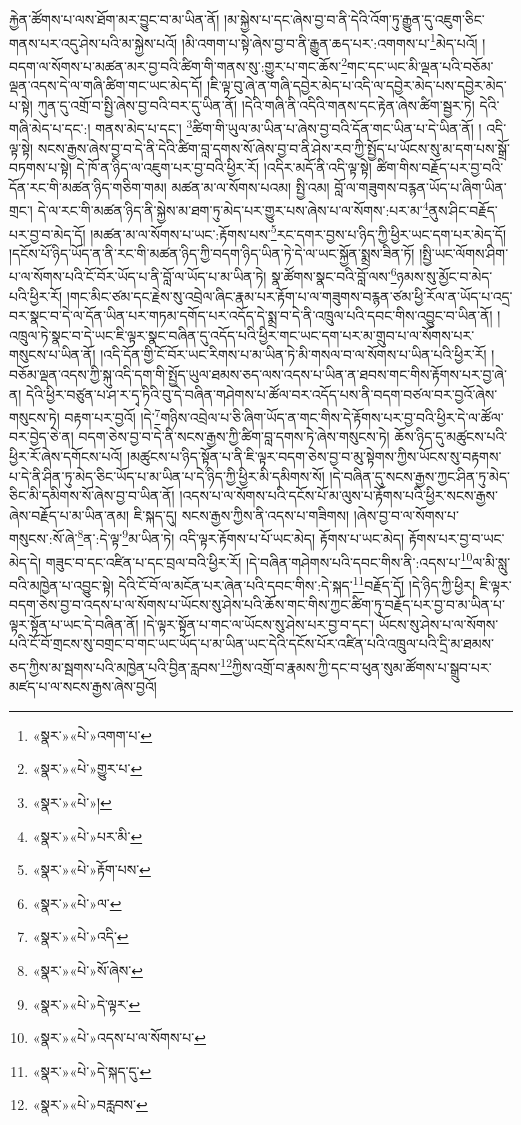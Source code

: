 རྐྱེན་ཚོགས་པ་ལས་ཐོག་མར་བྱུང་བ་མ་ཡིན་ནོ། །མ་སྐྱེས་པ་དང་ཞེས་བྱ་བ་ནི་དེའི་འོག་ཏུ་རྒྱུན་དུ་འཇུག་ཅིང་གནས་པར་འདུ་ཤེས་པའི་མ་སྐྱེས་པའོ། །མི་འགག་པ་སྟེ་ཞེས་བྱ་བ་ནི་རྒྱུན་ཆད་པར་:འགགས་པ་\footnote{«སྣར་»«པེ་»འགག་པ་}མེད་པའོ། །བདག་ལ་སོགས་པ་མཚན་མར་བྱ་བའི་ཚིག་གི་གནས་སུ་:གྱུར་པ་གང་ཆོས་\footnote{«སྣར་»«པེ་»གྱུར་པ་}གང་དང་ཡང་མི་ལྡན་པའི་བཅོམ་ལྡན་འདས་དེ་ལ་གཞི་ཚིག་གང་ཡང་མེད་དོ། །ཇི་ལྟ་བུ་ཞེ་ན་གཞི་དབྱེར་མེད་པ་འདི་ལ་དབྱེར་མེད་པས་དབྱེར་མེད་པ་སྟེ། ཀུན་དུ་འགྲོ་བ་སྤྱི་ཞེས་བྱ་བའི་བར་དུ་ཡིན་ནོ། །དེའི་གཞི་ནི་འདིའི་གནས་དང་རྟེན་ཞེས་ཚིག་སྦྱར་ཏེ། དེའི་གཞི་མེད་པ་དང་:། གནས་མེད་པ་དང་། \footnote{«སྣར་»«པེ་»།  }ཚིག་གི་ཡུལ་མ་ཡིན་པ་ཞེས་བྱ་བའི་དོན་གང་ཡིན་པ་དེ་ཡིན་ནོ། །
འདི་ལྟ་སྟེ། སངས་རྒྱས་ཞེས་བྱ་བ་དེ་ནི་དེའི་ཚིག་བླ་དགས་སོ་ཞེས་བྱ་བ་ནི་ཤེས་རབ་ཀྱི་སྤྱོད་པ་ཡོངས་སུ་མ་དག་པས་སྒྲོ་བཏགས་པ་སྟེ། དེ་ཁོ་ན་ཉིད་ལ་འཇུག་པར་བྱ་བའི་ཕྱིར་རོ། །འདིར་མདོ་ནི་འདི་ལྟ་སྟེ། ཚིག་གིས་བརྗོད་པར་བྱ་བའི་དོན་རང་གི་མཚན་ཉིད་གཅིག་གམ། མཚན་མ་ལ་སོགས་པའམ། སྤྱི་འམ། བློ་ལ་གཟུགས་བརྙན་ཡོད་པ་ཞིག་ཡིན་གྲང་། དེ་ལ་རང་གི་མཚན་ཉིད་ནི་སྐྱེས་མ་ཐག་ཏུ་མེད་པར་གྱུར་པས་ཞེས་པ་ལ་སོགས་:པར་མ་\footnote{«སྣར་»«པེ་»པར་མི་}ནུས་ཤིང་བརྗོད་པར་བྱ་བ་མེད་དོ། །མཚན་མ་ལ་སོགས་པ་ཡང་:རྟོགས་པས་\footnote{«སྣར་»«པེ་»རྟོག་པས་}རང་དགར་བྱས་པ་ཉིད་ཀྱི་ཕྱིར་ཡང་དག་པར་མེད་དོ། །དངོས་པོ་ཉིད་ཡོད་ན་ནི་རང་གི་མཚན་ཉིད་ཀྱི་བདག་ཉིད་ཡིན་ཏེ་དེ་ལ་ཡང་སྐྱོན་སྨྲས་ཟིན་ཏོ། །སྤྱི་ཡང་ལོགས་ཤིག་པ་ལ་སོགས་པའི་ངོ་བོར་ཡོད་པ་ནི་བློ་ལ་ཡོད་པ་མ་ཡིན་ཏེ། སྣ་ཚོགས་སྣང་བའི་བློ་ལས་\footnote{«སྣར་»«པེ་»ལ་}ཉམས་སུ་མྱོང་བ་མེད་པའི་ཕྱིར་རོ། །གང་མིང་ཙམ་དང་རྗེས་སུ་འབྲེལ་ཞིང་རྣམ་པར་རྟོག་པ་ལ་གཟུགས་བརྙན་ཙམ་ཕྱི་རོལ་ན་ཡོད་པ་འདྲ་བར་སྣང་བ་དེ་ལ་དོན་ཡིན་པར་གཏམ་དགོད་པར་འདོད་དེ་སྨྲ་བ་དེ་ནི་འཁྲུལ་པའི་དབང་གིས་འབྱུང་བ་ཡིན་ནོ། །འཁྲུལ་ཏེ་སྣང་བ་དེ་ཡང་ཇི་ལྟར་སྣང་བཞིན་དུ་འདོད་པའི་ཕྱིར་གང་ཡང་དག་པར་མ་གྲུབ་པ་ལ་སོགས་པར་གསུངས་པ་ཡིན་ནོ། །འདི་དོན་གྱི་ངོ་བོར་ཡང་རིགས་པ་མ་ཡིན་ཏེ་མི་གསལ་བ་ལ་སོགས་པ་ཡིན་པའི་ཕྱིར་རོ། །བཅོམ་ལྡན་འདས་ཀྱི་སྐུ་འདི་དག་གི་སྤྱོད་ཡུལ་ཐམས་ཅད་ལས་འདས་པ་ཡིན་ན་ཐབས་གང་གིས་རྟོགས་པར་བྱ་ཞེ་ན། དེའི་ཕྱིར་བཙུན་པ་ཤ་ར་དྭ་ཏིའི་བུ་དེ་བཞིན་གཤེགས་པ་ཚོལ་བར་འདོད་པས་ནི་བདག་བཙལ་བར་བྱའོ་ཞེས་གསུངས་ཏེ། བརྟག་པར་བྱའོ། །དེ་\footnote{«སྣར་»«པེ་»འདི་}གཉིས་འབྲེལ་པ་ཅི་ཞིག་ཡོད་ན་གང་གིས་དེ་རྟོགས་པར་བྱ་བའི་ཕྱིར་དེ་ལ་ཚོལ་བར་བྱེད་ཅེ་ན། བདག་ཅེས་བྱ་བ་དེ་ནི་སངས་རྒྱས་ཀྱི་ཚིག་བླ་དགས་ཏེ་ཞེས་གསུངས་ཏེ། ཆོས་ཉིད་དུ་མཚུངས་པའི་ཕྱིར་རོ་ཞེས་དགོངས་པའོ། །མཚུངས་པ་ཉིད་སྟོན་པ་ནི་ཇི་ལྟར་བདག་ཅེས་བྱ་བ་མུ་སྟེགས་ཀྱིས་ཡོངས་སུ་བརྟགས་པ་དེ་ནི་ཤིན་ཏུ་མེད་ཅིང་ཡོད་པ་མ་ཡིན་པ་དེ་ཉིད་ཀྱི་ཕྱིར་མི་དམིགས་སོ། །དེ་བཞིན་དུ་སངས་རྒྱས་ཀྱང་ཤིན་ཏུ་མེད་ཅིང་མི་དམིགས་སོ་ཞེས་བྱ་བ་ཡིན་ནོ། །འདས་པ་ལ་སོགས་པའི་དངོས་པོ་མ་ལུས་པ་རྟོགས་པའི་ཕྱིར་སངས་རྒྱས་ཞེས་བརྗོད་པ་མ་ཡིན་ནམ། ཇི་སྐད་དུ། སངས་རྒྱས་ཀྱིས་ནི་འདས་པ་གཟིགས། །ཞེས་བྱ་བ་ལ་སོགས་པ་གསུངས་:སོ་ཞེ་\footnote{«སྣར་»«པེ་»སོ་ཞེས་}ན་:དེ་ལྟ་\footnote{«སྣར་»«པེ་»དེ་ལྟར་}མ་ཡིན་ཏེ། འདི་ལྟར་རྟོགས་པ་པོ་ཡང་མེད། རྟོགས་པ་ཡང་མེད། རྟོགས་པར་བྱ་བ་ཡང་མེད་དེ། གཟུང་བ་དང་འཛིན་པ་དང་བྲལ་བའི་ཕྱིར་རོ། །དེ་བཞིན་གཤེགས་པའི་དབང་གིས་ནི་:འདས་པ་\footnote{«སྣར་»«པེ་»འདས་པ་ལ་སོགས་པ་}ལ་མི་སླུ་བའི་མཁྱེན་པ་འབྱུང་སྟེ། དེའི་ངོ་བོ་ལ་མངོན་པར་ཞེན་པའི་དབང་གིས་:དེ་སྐད་\footnote{«སྣར་»«པེ་»དེ་སྐད་དུ་}བརྗོད་དོ། །དེ་ཉིད་ཀྱི་ཕྱིར། ཇི་ལྟར་བདག་ཅེས་བྱ་བ་འདས་པ་ལ་སོགས་པ་ཡོངས་སུ་ཤེས་པའི་ཆོས་གང་གིས་ཀྱང་ཚིག་ཏུ་བརྗོད་པར་བྱ་བ་མ་ཡིན་པ་ལྟར་སྟོན་པ་ཡང་དེ་བཞིན་ནོ། །དེ་ལྟར་སྟོན་པ་གང་ལ་ཡོངས་སུ་ཤེས་པར་བྱ་བ་དང་། ཡོངས་སུ་ཤེས་པ་ལ་སོགས་པའི་ངོ་བོ་གྲངས་སུ་བགྲང་བ་གང་ཡང་ཡོད་པ་མ་ཡིན་ཡང་དེའི་དངོས་པོར་འཛིན་པའི་འཁྲུལ་པའི་དྲི་མ་ཐམས་ཅད་ཀྱིས་མ་སྦགས་པའི་མཁྱེན་པའི་བྱིན་རླབས་\footnote{«སྣར་»«པེ་»བརླབས་}ཀྱིས་འགྲོ་བ་རྣམས་ཀྱི་དང་བ་ཕུན་སུམ་ཚོགས་པ་སྒྲུབ་པར་མཛད་པ་ལ་སངས་རྒྱས་ཞེས་བྱའོ། 